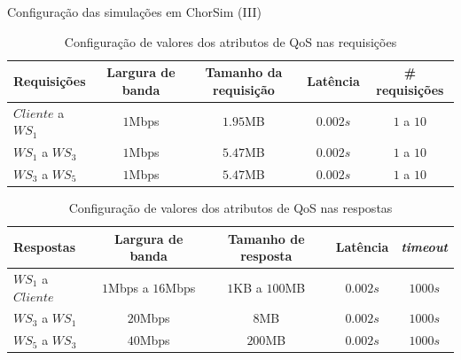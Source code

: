 \documentclass[xcolor=svgnames]{beamer}
\begin{document}
  \begin{frame}{Configuração das simulações em ChorSim (III)}  
      \begin{table}[!h]
	    \centering
      {\footnotesize
	    \caption{Configuração de valores dos atributos de QoS nas requisições}
	    \label{table:simulation_configuration_responses}
	  \begin{tabular}{|l|c|c|c|c|}
		\hline
		\textbf{Requisições}           &  Largura de banda     &   Tamanho da requisição    &  Latência       &  \# requisições	  \\
		\hline
		$Cliente$ a $WS_1$    &    $1$Mbps	              &      $1.95$MB        &   $0.002s$      &     $1$ a $10$     \\
		$WS_1$ a $WS_3$       &    $1$Mbps	              &      $5.47$MB        &   $0.002s$      &     $1$ a $10$     \\
		$WS_3$ a $WS_5$       &    $1$Mbps                  &      $5.47$MB        &   $0.002s$      &       $1$ a $10$     \\
		\hline
		\end{tabular}
      }
      \end{table}

      \pause
      \begin{table}[!h]
	    \centering
      {\footnotesize
	    \caption{Configuração de valores dos atributos de QoS nas respostas}
	    \label{table:simulation_configuration_requests}
	  \begin{tabular}{|l|c|c|c|c|}
		\hline
		\textbf{Respostas}           &  Largura de banda           &   Tamanho de resposta    &  Latência         &   \emph{timeout}	  \\
		\hline
		$WS_1$ a $Cliente$  &    $1$Mbps a $16$Mbps	        &    $1$KB a  $100$MB                   &   $0.002s$      &   $1000s$     \\
		$WS_3$ a $WS_1$     &    $20$Mbps	                &      $8$MB                   &   $0.002s$      &   $1000s$     \\
		$WS_5$ a $WS_3$     &    $40$Mbps                 &      $200$MB                 &   $0.002s$      &   $1000s$     \\
		\hline
		\end{tabular}
      }
      \end{table}
  \end{frame}
\end{document}
